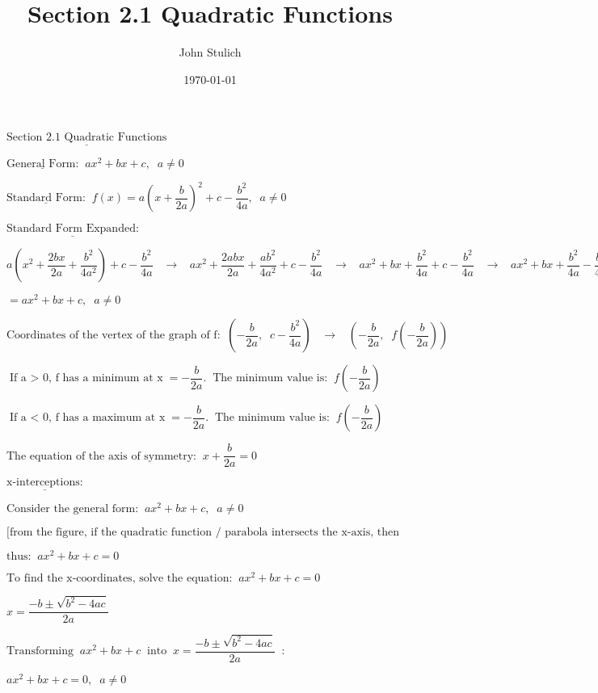 \documentclass[12pt]{article}
\title{\textbf{Section 2.1 Quadratic Functions}}
\author{
	John Stulich
}
\date{\today}
\begin{document}
\maketitle

$\underline{\text{Section 2.1 Quadratic Functions}}$

$\underline{\text{General Form:}} \;\; ax^2 + bx + c, \;\; a \neq 0 $

$\underline{\text{Standard Form:}} \;\; f(x) = a\left(x + \dfrac{b}{2a}\right)^2 + c - \dfrac{b^2}{4a}, \;\; a \neq 0 $

$\underline{\text{Standard Form Expanded:}}$

$a\left(x^2 + \dfrac{2bx}{2a} + \dfrac{b^2}{4a^2}\right) + c - \dfrac{b^2}{4a} \;\;\; \rightarrow \;\;\; ax^2 + \dfrac{2abx}{2a} + \dfrac{ab^2}{4a^2} + c - \dfrac{b^2}{4a} \;\;\; \rightarrow \;\;\; ax^2 + bx + \dfrac{b^2}{4a} + c - \dfrac{b^2}{4a} \;\;\; \rightarrow \;\;\; ax^2 + bx + \dfrac{b^2}{4a} - \dfrac{b^2}{4a} + c$

$= ax^2 + bx + c, \;\; a \neq 0$

$\text{Coordinates of the vertex of the graph of f:} \;\; \left(-\dfrac{b}{2a}, \;\; c - \dfrac{b^2}{4a} \right) \;\;\; \rightarrow \;\;\; \left(-\dfrac{b}{2a}, \;\; f\left(-\dfrac{b}{2a}\right) \right)$

$\text{If a $>$ 0, f has a minimum at x} = -\dfrac{b}{2a}. \;\; \text{The minimum value is:} \;\; f\left(-\dfrac{b}{2a}\right)$

$\text{If a $<$ 0, f has a maximum at x} = -\dfrac{b}{2a}. \;\; \text{The minimum value is:} \;\; f\left(-\dfrac{b}{2a}\right)$

$\text{The equation of the axis of symmetry:} \;\; x + \dfrac{b}{2a} = 0$

$\underline{\text{x-interceptions:}}$

$\text{Consider the general form:} \;\; ax^2 + bx + c, \;\; a \neq 0 $

$\text{[from the figure, if the quadratic function / parabola intersects the x-axis, then the y-coordinate is always zero]}$

$\text{thus:} \;\; ax^2 + bx + c = 0$

$\text{To find the x-coordinates, solve the equation:} \;\; ax^2 + bx + c = 0$

$x = \dfrac{-b \pm \sqrt{b^2 - 4ac}}{2a}$

$\text{Transforming} \;\; ax^2 + bx + c \;\; \text{into} \;\; x = \dfrac{-b \pm \sqrt{b^2 - 4ac}}{2a} \;\; :$

$ax^2 + bx + c = 0, \;\; a \neq 0 $
\end{document}
